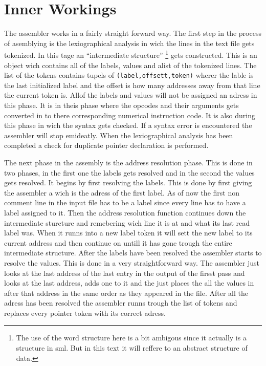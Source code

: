 \documentclass{article}
\begin{document}
\section{Inner Workings}
The assembler works in a fairly straight forward way. The first step in the
process of asemblying is the lexiographical analysis in wich the lines in the
text file gets tokenized. In this tage an ``intermediate structure''
\footnote{The use of the word structure here is a bit ambigous since it
actually is a structure in sml. But in this text it will reffere to an abstract
structure of data.} gets constructed.
This is an object wich contains all of the labels, values and alist of the tokenized lines. The list of 
the tokens contains tupels of
\verb+(label,offsett,token)+ wherer the lable is the last initialized label and
the offset is how many addresses away from that line the current token is. Allof
the labels and values will not be assigned an adress in this phase. It is in
theis phase where the opcodes and their arguments gets converted in to there
corresponding numerical instruction code. It is also during this phase in wich
the syntax gets checked. If a syntax error is encountered the assembler will
stop emideatly. When the lexiographical analysis has been completed a check for
duplicate pointer declaration is performed.

The next phase in the assembly is the address resolution phase. This is done in
two phases, in the first one the labels gets resolved and in the second the
values gets  resolved. It begins by first resolving the labels.
This is done by first giving the assembler a  wich is the adress of the first label. As of now the first
non comment line in the input file has to be a label since every line has to
have a label assigned to it. Then the address resolution function continues down
the intermediate sturcture and remebering wich line it is at and what its last
read label was. When it runns into a new label token it will sett the new label
to its current address and then continue on untill it has gone trough the entire
intermediate structure. After the labels have been resolved the assembler starts
to resolve the values. This is done in a very straightforward way. The assembler
just looks at the last address of the last entry in the output of the firsst
pass and looks at the last address, adds one to it and the just places the all
the values in after that address in the same order as they appeared in the file.
After all the adress has been resolved the assembler runns trough the list of
tokens and replaces every pointer token with its correct adress.
\end{document}

